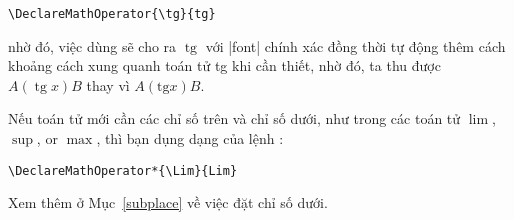 \documentclass[11pt,leqno,titlepage,openany]{amsldoc}[1999/12/13]
\DeclareMathOperator{\tg}{tg}
\DeclareMathOperator{\xxx}{xxx}
\begin{document}
\begin{verbatim}
\DeclareMathOperator{\tg}{tg}
\end{verbatim}
nhờ đó, việc dùng  sẽ cho ra $\tg$ với |font| chính xác
đồng thời tự động thêm cách khoảng cách xung quanh toán tử {\upshape tg}
khi cần thiết, nhờ đó, ta thu được $A(\tg x)B$ thay vì $A(\mathrm{tg}x)B$.

\medskip
Nếu toán tử mới cần các chỉ số trên và chỉ số dưới, như trong các toán tử
$\lim$, $\sup$, or $\max$, thì bạn dụng dạng \qc{\*} của lệnh :

\medskip
\begin{verbatim}
\DeclareMathOperator*{\Lim}{Lim}
\end{verbatim}

\medskip\noindent
Xem thêm ở Mục~\ref{subplace} về việc đặt chỉ số dưới.
\end{document}
